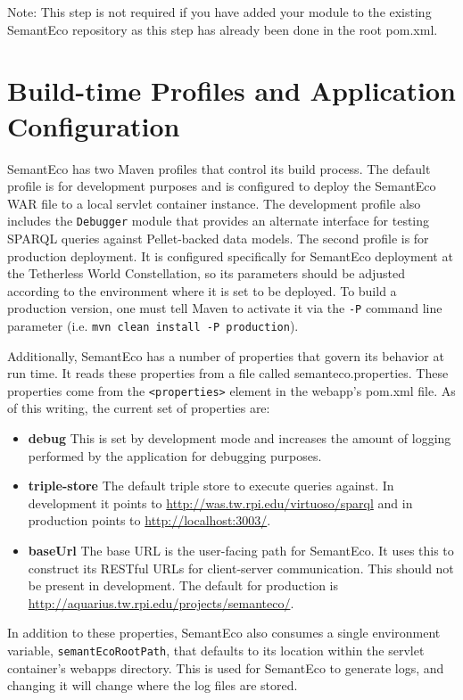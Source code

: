 \documentclass[letterpaper]{report}
\begin{document}
\noindent Note: This step is not required if you have added your module to the existing SemantEco repository as this step has already been done in the root pom.xml.

\section{Build-time Profiles and Application Configuration}
SemantEco has two Maven profiles that control its build process. The default profile is for development purposes and is configured to deploy the SemantEco WAR file to a local servlet container instance. The development profile also includes the \texttt{Debugger} module that provides an alternate interface for testing SPARQL queries against Pellet-backed data models. The second profile is for production deployment. It is configured specifically for SemantEco deployment at the Tetherless World Constellation, so its parameters should be adjusted according to the environment where it is set to be deployed. To build a production version, one must tell Maven to activate it via the \texttt{-P} command line parameter (i.e. \texttt{mvn clean install -P production}).

Additionally, SemantEco has a number of properties that govern its behavior at run time. It reads these properties from a file called semanteco.properties. These properties come from the \texttt{<properties>} element in the webapp's pom.xml file. As of this writing, the current set of properties are:

\begin{itemize}
\item \textbf{debug} This is set by development mode and increases the amount of logging performed by the application for debugging purposes.
\item \textbf{triple-store} The default triple store to execute queries against. In development it points to \url{http://was.tw.rpi.edu/virtuoso/sparql} and in production points to \url{http://localhost:3003/}.
\item \textbf{baseUrl} The base URL is the user-facing path for SemantEco. It uses this to construct its RESTful URLs for client-server communication. This should not be present in development. The default for production is \url{http://aquarius.tw.rpi.edu/projects/semanteco/}.
\end{itemize}

In addition to these properties, SemantEco also consumes a single environment variable, \texttt{semantEcoRootPath}, that defaults to its location within the servlet container's webapps directory. This is used for SemantEco to generate logs, and changing it will change where the log files are stored.
\end{document}
